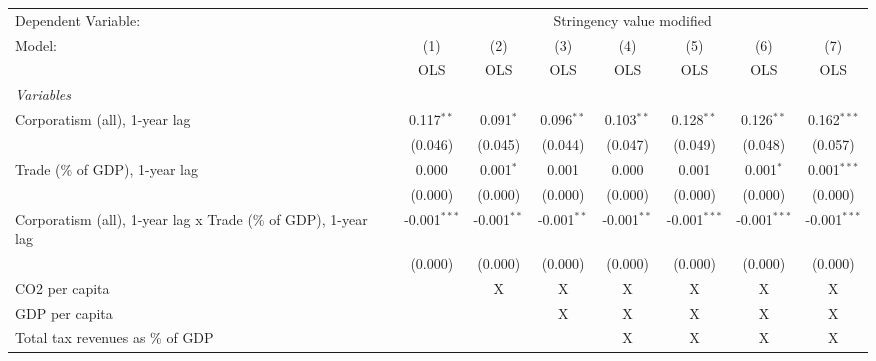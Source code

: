 
\begingroup
\centering
\begin{tabular}{lccccccc}
   \toprule
   Dependent Variable: & \multicolumn{7}{c}{Stringency value modified}\\
   Model:                                                         & (1)            & (2)           & (3)           & (4)           & (5)            & (6)            & (7)\\  
                                                                  &  OLS           & OLS           & OLS           & OLS           & OLS            & OLS            & OLS\\  
   \midrule
   \emph{Variables}\\
   Corporatism (all), 1-year lag                                  & 0.117$^{**}$   & 0.091$^{*}$   & 0.096$^{**}$  & 0.103$^{**}$  & 0.128$^{**}$   & 0.126$^{**}$   & 0.162$^{***}$\\   
                                                                  & (0.046)        & (0.045)       & (0.044)       & (0.047)       & (0.049)        & (0.048)        & (0.057)\\   
   Trade (\% of GDP), 1-year lag                                  & 0.000          & 0.001$^{*}$   & 0.001         & 0.000         & 0.001          & 0.001$^{*}$    & 0.001$^{***}$\\   
                                                                  & (0.000)        & (0.000)       & (0.000)       & (0.000)       & (0.000)        & (0.000)        & (0.000)\\   
   Corporatism (all), 1-year lag x Trade (\% of GDP), 1-year lag  & -0.001$^{***}$ & -0.001$^{**}$ & -0.001$^{**}$ & -0.001$^{**}$ & -0.001$^{***}$ & -0.001$^{***}$ & -0.001$^{***}$\\   
                                                                  & (0.000)        & (0.000)       & (0.000)       & (0.000)       & (0.000)        & (0.000)        & (0.000)\\   
   CO2 per capita                                                 &                & X             & X             & X             & X              & X              & X\\  
   GDP per capita                                                 &                &               & X             & X             & X              & X              & X\\  
   Total tax revenues as \% of GDP                                &                &               &               & X             & X              & X              & X\\  

\end{tabular}
